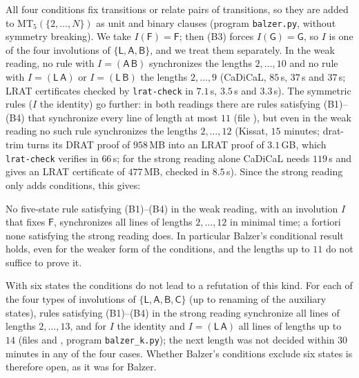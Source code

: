 All four conditions fix transitions or relate pairs of transitions, so they
are added to $\mathrm{MT}_5(\{2,\dots,N\})$ as unit and binary clauses (program
\texttt{balzer.py}, without symmetry breaking). We take $I(\mathsf
F)=\mathsf F$; then (B3) forces $I(\mathsf G)=\mathsf G$, so $I$ is one of
the four involutions of $\{\mathsf L,\mathsf A,\mathsf B\}$, and we treat
them separately. In the weak reading, no rule with $I=(\mathsf A\,\mathsf
B)$ synchronizes the lengths $2,\dots,10$ and no rule with $I=(\mathsf
L\,\mathsf A)$ or $I=(\mathsf L\,\mathsf B)$ the lengths $2,\dots,9$
(CaDiCaL, $85$\,s, $37$\,s and $37$\,s; LRAT certificates checked by
\texttt{lrat-check} in $7.1$\,s, $3.5$\,s and $3.3$\,s). The symmetric rules ($I$ the
identity) go further: in both readings there are rules satisfying
(B1)--(B4) that synchronize every line of length at most $11$ (file
), but even in the weak reading no such
rule synchronizes the lengths $2,\dots,12$ (Kissat, $15$ minutes;
\textsf{drat-trim} \cite{WetzlerHeuleHunt14} turns its DRAT proof of
$958$\,MB into an LRAT proof of $3.1$\,GB, which \texttt{lrat-check} verifies
in $66$\,s; for the strong reading alone CaDiCaL needs $119$\,s and gives an
LRAT certificate of $477$\,MB, checked in $8.5$\,s). Since the strong
reading only adds conditions, this gives:

\begin{proposition}\label{prop:balzer}
No five-state rule satisfying (B1)--(B4) in the weak reading, with an
involution $I$ that fixes $\mathsf F$, synchronizes all lines of lengths
$2,\dots,12$ in minimal time; a fortiori none satisfying the strong reading
does. In particular Balzer's conditional result holds, even for the weaker
form of the conditions, and the lengths up to $11$ do not suffice to prove
it.
\end{proposition}

With six states the conditions do not lead to a refutation of this kind.
For each of the four types of involutions of $\{\mathsf L,\mathsf A,\mathsf
B,\mathsf C\}$ (up to renaming of the auxiliary states), rules satisfying
(B1)--(B4) in the strong reading synchronize all lines of lengths
$2,\dots,13$, and for $I$ the identity and $I=(\mathsf L\,\mathsf A)$ all lines
of lengths up to $14$ (files  and
, program \texttt{balzer\_k.py}); the next
length was not decided within $30$ minutes in any of the four cases.
Whether Balzer's conditions exclude six states is therefore open, as it was
for Balzer.

